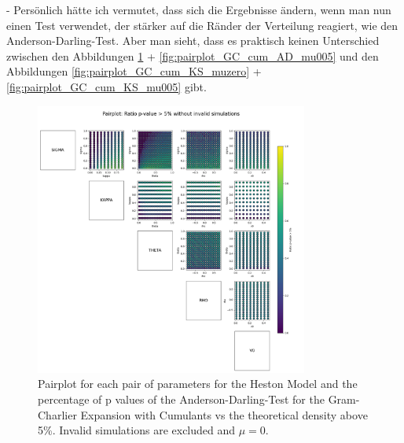 - Persönlich hätte ich vermutet, dass sich die Ergebnisse ändern, wenn man nun einen Test verwendet, der stärker auf die Ränder der Verteilung reagiert, wie den Anderson-Darling-Test. Aber man sieht, dass es praktisch keinen Unterschied zwischen den Abbildungen \ref{fig:pairplot_GC_cum_AD_muzero} + \ref{fig:pairplot_GC_cum_AD_mu005} und den Abbildungen \ref{fig:pairplot_GC_cum_KS_muzero} + \ref{fig:pairplot_GC_cum_KS_mu005} gibt.

\begin{figure}
    \centering
    \includegraphics[width=0.8\textwidth]{img/pairplot_GC_cum_AD_muzero.png}
    \caption{Pairplot for each pair of parameters for the Heston Model and the percentage of p values of the Anderson-Darling-Test for the Gram-Charlier Expansion with Cumulants vs the theoretical density above 5\%. Invalid simulations are excluded and $\mu=0$.}
    \label{fig:pairplot_GC_cum_AD_muzero}
\end{figure}

